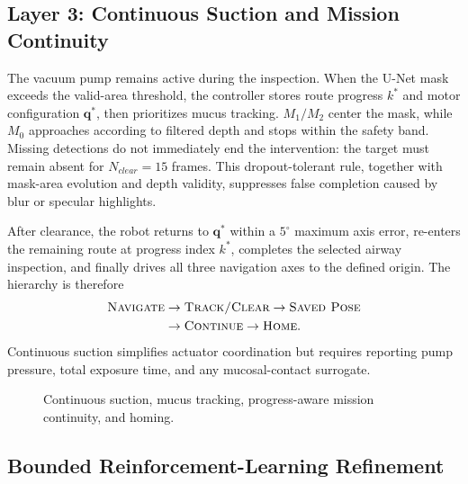 \documentclass[letterpaper,10pt,conference]{ieeeconf}
\begin{document}
\subsection{Layer 3: Continuous Suction and Mission Continuity}

The vacuum pump remains active during the inspection. When the U-Net mask
exceeds the valid-area threshold, the controller stores route progress $k^*$
and motor configuration $\mathbf q^*$, then prioritizes mucus tracking.
$M_1/M_2$ center the mask, while $M_0$ approaches according to filtered depth
and stops within the safety band. Missing detections do not immediately end the
intervention: the target must remain absent for $N_{clear}=15$ frames. This
dropout-tolerant rule, together with mask-area evolution and depth validity,
suppresses false completion caused by blur or specular highlights.

After clearance, the robot returns to $\mathbf q^*$ within a $5^\circ$ maximum
axis error, re-enters the remaining route at progress index $k^*$, completes the
selected airway inspection, and finally drives all three navigation axes to the
defined origin. The hierarchy is therefore
\begin{align}
 \textsc{Navigate}&\rightarrow\textsc{Track/Clear}\rightarrow\textsc{Saved Pose}\nonumber\\
 &\rightarrow\textsc{Continue}\rightarrow\textsc{Home}.
\end{align}
Continuous suction simplifies actuator coordination but requires reporting
pump pressure, total exposure time, and any mucosal-contact surrogate.

\begin{figure}[t]
\centering
{}
\caption{Continuous suction, mucus tracking, progress-aware mission continuity, and homing.}
\label{fig:layer3}
\end{figure}

\subsection{Bounded Reinforcement-Learning Refinement}
\end{document}
